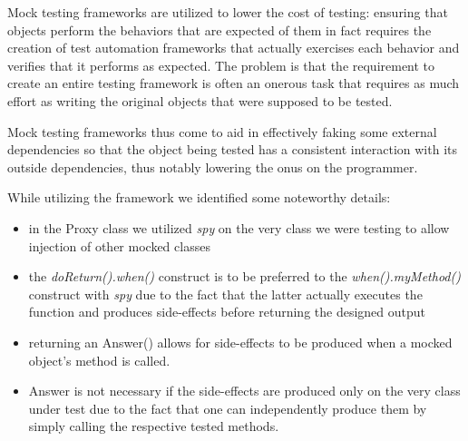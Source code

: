\documentclass{beamer}
\begin{document}
Mock testing frameworks are utilized to lower the cost of testing: ensuring that objects perform the behaviors that are expected of them in fact requires the creation of test automation frameworks that actually exercises each behavior and verifies that it performs as expected. The problem is that the requirement to create an entire testing framework is often an onerous task that requires as much effort as writing the original objects that were supposed to be tested. 

Mock testing frameworks thus come to aid in effectively faking some external dependencies so that the object being tested has a consistent interaction with its outside dependencies, thus notably lowering the onus on the programmer.

While utilizing the framework we identified some noteworthy details:
\begin{itemize}
	\item in the Proxy class we utilized \textit{spy} on the very class we were testing to allow injection of other mocked classes
	\item the \textit{doReturn().when()} construct is to be preferred to the \textit{when().myMethod()} construct with \textit{spy} due to the fact that the latter actually executes the function and produces side-effects before returning the designed output
	\item returning an Answer() allows for side-effects to be produced when a mocked object's method is called. 
	\item Answer is not necessary if the side-effects are produced only on the very class under test due to the fact that one can independently produce them by simply calling the respective tested methods.
\end{itemize}
\end{document}
